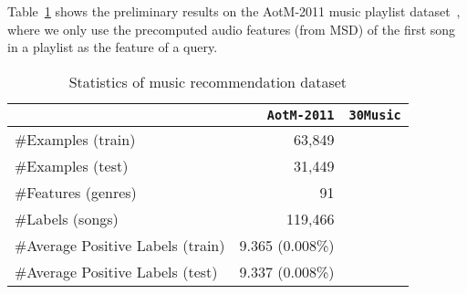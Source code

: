 Table~\ref{tab:dataset_music} shows the preliminary results on the AotM-2011 music playlist dataset~\cite{mcfee2012},
where we only use the precomputed audio features (from MSD) of the first song in a playlist as the feature of a query.

\begin{table}[!h]
\centering
\caption{Statistics of music recommendation dataset}
\label{tab:dataset_music}
\begin{tabular}{l*{2}{r}} \hline \hline
                                  & \texttt{AotM-2011} & \texttt{30Music}  \\ \hline 
\#Examples (train)                & 63,849             & \\
\#Examples (test)                 & 31,449             & \\
\#Features (genres)               & 91                 & \\
\#Labels (songs)                  & 119,466            & \\
\#Average Positive Labels (train) & 9.365 (0.008\%)    & \\
\#Average Positive Labels (test)  & 9.337 (0.008\%)    & \\
\hline
\end{tabular}
\end{table}



